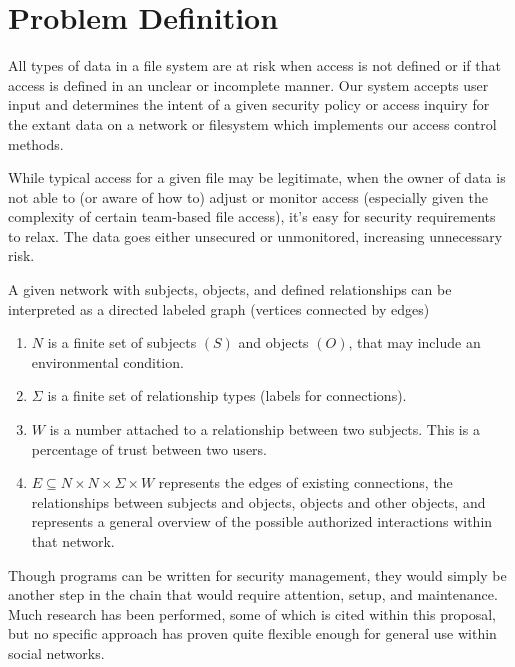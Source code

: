 \documentclass[12pt]{article}
\begin{document}
\section{Problem Definition}
All types of data in a file system are at risk when access is not defined or if that access is defined in an unclear or incomplete manner. Our system accepts user input and determines the intent of a given security policy or access inquiry for the extant data on a network or filesystem which implements our access control methods.

While typical access for a given file may be legitimate, when the owner of data is not able to (or aware of how to) adjust or monitor access (especially given the complexity of certain team-based file access), it’s easy for security requirements to relax. The data goes either unsecured or unmonitored, increasing unnecessary risk.

A given network with subjects, objects, and defined relationships can be interpreted as a directed labeled graph (vertices connected by edges)
\begin{enumerate}
    \item $N$ is a finite set of subjects $(S)$ and objects $(O)$, that may include an environmental condition.
    \item $\Sigma$ is a finite set of relationship types (labels for connections).
    \item $W$ is a number attached to a relationship between two subjects. This is a percentage of trust between two users.
    \item $E \subseteq N \times N \times \Sigma \times W$ represents the edges of existing connections, the relationships between subjects and objects, objects and other objects, and represents a general overview of the possible authorized interactions within that network\cite{morovat16}.
\end{enumerate}

Though programs can be written for security management, they would simply be another step in the chain that would require attention, setup, and maintenance. Much research has been performed, some of which is cited within this proposal, but no specific approach has proven quite flexible enough for general use within social networks.
\end{document}
